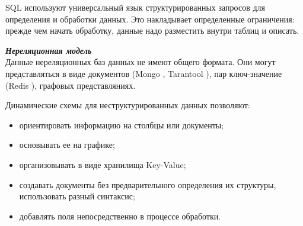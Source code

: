 SQL используют универсальный язык структурированных запросов для определения и обработки данных. Это накладывает определенные ограничения: прежде чем начать обработку, данные надо разместить внутри таблиц и описать.

\textbf{\textit{Нереляционная модель}}\\
Данные нереляционных баз данных не имеют общего формата. Они могут представляться в виде документов (Mongo \cite{mongodb}, Tarantool \cite{tarantool}), пар ключ-значение (Redis \cite{redis}), графовых представляниях.

Динамические схемы для неструктурированных данных позволяют:
\begin{itemize}
    \item ориентировать информацию на столбцы или документы;
    \item основывать ее на графике;
    \item организовывать в виде хранилища Key-Value;
    \item создавать документы без предварительного определения их структуры, использовать разный синтаксис;
    \item добавлять поля непосредственно в процессе обработки.
\end{itemize}

